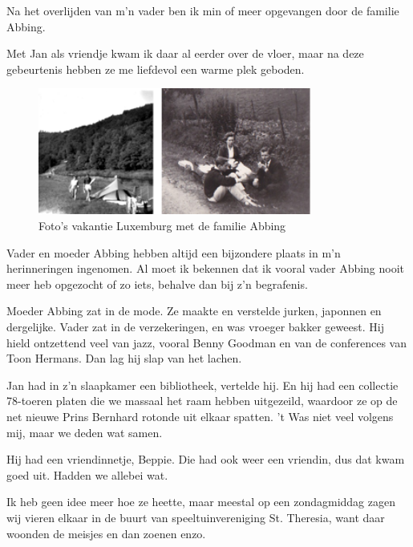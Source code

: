 \documentclass[12pt,twoside, openright]{memoir}
\begin{document}
Na het overlijden van m’n vader ben ik min of meer opgevangen door de familie Abbing. 

Met Jan als vriendje kwam ik daar al eerder over de vloer, maar na deze gebeurtenis hebben ze me liefdevol een warme plek geboden.

\begin{figure}
\centering
\includegraphics[width=0.8\textwidth]{img/ch21/luxvak}
\caption*{\footnotesize Foto’s vakantie Luxemburg met de familie Abbing}
\end{figure}

Vader en moeder Abbing hebben altijd een bijzondere plaats in m’n herinneringen ingenomen. Al moet ik bekennen dat ik vooral vader Abbing nooit meer heb opgezocht of zo iets, behalve dan bij z’n begrafenis. 

Moeder Abbing zat in de mode. Ze maakte en verstelde jurken, japonnen en dergelijke. Vader zat in de verzekeringen, en was vroeger bakker geweest. Hij hield ontzettend veel van jazz, vooral Benny Goodman en van de conferences van Toon Hermans. Dan lag hij slap van het lachen.

Jan had in z’n slaapkamer een bibliotheek, vertelde hij. En hij had een collectie 78-toeren platen die we massaal het raam hebben uitgezeild, waardoor ze op de net nieuwe Prins Bernhard rotonde uit elkaar spatten. ’t Was niet veel volgens mij, maar we deden wat samen. 

Hij had een vriendinnetje, Beppie. Die had ook weer een vriendin, dus dat kwam goed uit. Hadden we allebei wat. 

Ik heb geen idee meer hoe ze heette, maar meestal op een zondagmiddag zagen wij vieren elkaar in de buurt van speeltuinvereniging St. Theresia, want daar woonden de meisjes en dan zoenen enzo.
\end{document}
